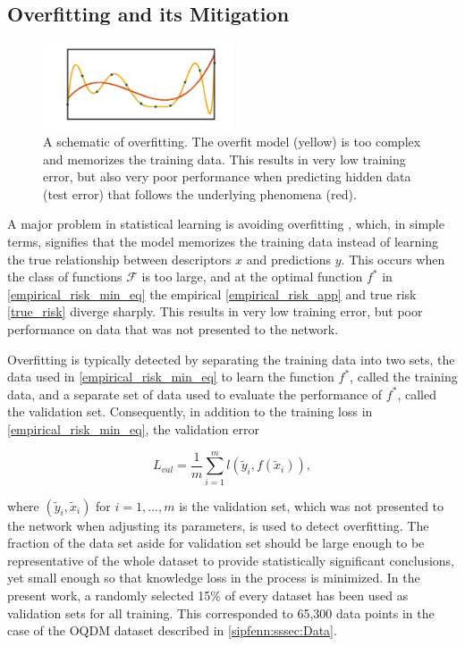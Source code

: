 \subsection{Overfitting and its Mitigation}
\label{sipfenn:ssec:overfitting}

\begin{figure}[h]
    \centering
    \includegraphics[width=0.5\textwidth]{sipfenn/overfitting.png}
    \caption{A schematic of overfitting. The overfit model (yellow) is too complex and memorizes the training data. This results in very low training error, but also very poor performance when predicting hidden data (test error) that follows the underlying phenomena (red).}
    \label{sipfenn:fig:overfitting}
\end{figure}

A major problem in statistical learning is avoiding overfitting \cite{hastie2009elements}, which, in simple terms, signifies that the model memorizes the training data instead of learning the true  relationship between descriptors $x$ and predictions $y$. This occurs when the class of functions $\mathcal{F}$ is too large, and at the optimal function $f^*$ in \eqref{empirical_risk_min_eq} the empirical \eqref{empirical_risk_app} and true risk \eqref{true_risk} diverge sharply. This results in very low training error, but poor performance on data that was not presented to the network.

Overfitting is typically detected by separating the training data into two sets, the data used in \eqref{empirical_risk_min_eq} to learn the function $f^*$, called the training data, and a separate set of data used to evaluate the performance of $f^*$, called the validation set. Consequently, in addition to the training loss in \eqref{empirical_risk_min_eq}, the validation error

\begin{equation}\label{sipfenn:validation_loss}
    L_{val} = \frac{1}{m}\displaystyle\sum_{i=1}^m l(\tilde{y}_i, f(\tilde{x}_i)),
\end{equation}

where $(\tilde{y}_i,\tilde{x}_i)$ for $i=1,...,m$ is the validation set, which was not presented to the network when adjusting its parameters, is used to detect overfitting. 
The fraction of the data set aside for validation set should be large enough to be representative of the whole dataset to provide statistically significant conclusions, yet small enough so that knowledge loss in the process is minimized. In the present work, a randomly selected 15\% of every dataset has been used as validation sets for all training. This corresponded to 65,300 data points in the case of the OQDM dataset described in \ref{sipfenn:sssec:Data}.

